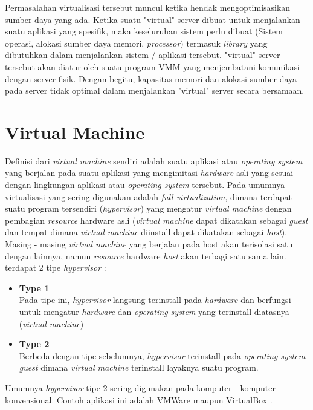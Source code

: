 Permasalahan virtualisasi tersebut muncul ketika hendak mengoptimisasikan sumber daya yang ada. Ketika suatu "virtual" server dibuat untuk menjalankan suatu aplikasi yang spesifik, maka keseluruhan sistem perlu dibuat (Sistem operasi, alokasi sumber daya memori, \textit{processor}) termasuk \textit{library} yang dibutuhkan dalam menjalankan sistem / aplikasi tersebut. "virtual" server tersebut akan diatur oleh suatu program VMM yang menjembatani komunikasi dengan server fisik. Dengan begitu, kapasitas memori dan alokasi sumber daya pada server tidak optimal dalam menjalankan "virtual" server secara bersamaan.

\section{Virtual Machine}
Definisi dari \textit{virtual machine} sendiri adalah suatu aplikasi atau \textit{operating system} yang berjalan pada suatu aplikasi yang mengimitasi \textit{hardware} asli yang sesuai dengan lingkungan aplikasi atau \textit{operating system} tersebut. Pada umumnya virtualisasi yang sering digunakan adalah \textit{full virtualization}, dimana terdapat suatu program tersendiri (\textit{hypervisor}) yang mengatur \textit{virtual machine} dengan pembagian \textit{resource} hardware asli (\textit{virtual machine} dapat dikatakan sebagai \textit{guest} dan tempat dimana \textit{virtual machine} diinstall dapat dikatakan sebagai \textit{host}). Masing - masing \textit{virtual machine} yang berjalan pada host akan terisolasi satu dengan lainnya, namun \textit{resource} hardware \textit{host} akan terbagi satu sama lain. terdapat 2 tipe \textit{hypervisor} :
\begin{itemize}
	\item \textbf{Type 1} \\ Pada tipe ini, \textit{hypervisor} langsung terinstall pada \textit{hardware} dan berfungsi untuk mengatur \textit{hardware} dan \textit{operating system} yang terinstall diatasnya (\textit{virtual machine})
	\item \textbf{Type 2} \\ Berbeda dengan tipe sebelumnya, \textit{hypervisor} terinstall pada \textit{operating system guest} dimana \textit{virtual machine} terinstall layaknya suatu program.
\end{itemize}

Umumnya \textit{hypervisor} tipe 2 sering digunakan pada komputer - komputer konvensional. Contoh aplikasi ini adalah VMWare\cite{vmware} maupun VirtualBox \cite{virtualbox}.


